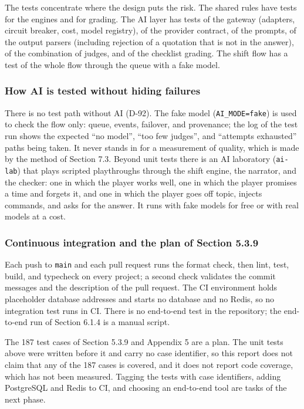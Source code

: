 The tests concentrate where the design puts the risk. The shared rules have tests for the engines and for grading. The AI layer has tests of the gateway (adapters, circuit breaker, cost, model registry), of the provider contract, of the prompts, of the output parsers (including rejection of a quotation that is not in the answer), of the combination of judges, and of the checklist grading. The shift flow has a test of the whole flow through the queue with a fake model.

\subsubsection{How AI is tested without hiding failures}

There is no test path without AI (D-92). The fake model (\texttt{AI\_\allowbreak{}MODE=fake}) is used to check the flow only: queue, events, failover, and provenance; the log of the test run shows the expected ``no model'', ``too few judges'', and ``attempts exhausted'' paths being taken. It never stands in for a measurement of quality, which is made by the method of Section 7.3. Beyond unit tests there is an AI laboratory (\texttt{ai-\allowbreak{}lab}) that plays scripted playthroughs through the shift engine, the narrator, and the checker: one in which the player works well, one in which the player promises a time and forgets it, and one in which the player goes off topic, injects commands, and asks for the answer. It runs with fake models for free or with real models at a cost.

\subsubsection{Continuous integration and the plan of Section 5.3.9}

Each push to \texttt{main} and each pull request runs the format check, then lint, test, build, and typecheck on every project; a second check validates the commit messages and the description of the pull request. The CI environment holds placeholder database addresses and starts no database and no Redis, so no integration test runs in CI. There is no end-to-end test in the repository; the end-to-end run of Section 6.1.4 is a manual script.

The 187 test cases of Section 5.3.9 and Appendix 5 are a plan. The unit tests above were written before it and carry no case identifier, so this report does not claim that any of the 187 cases is covered, and it does not report code coverage, which has not been measured. Tagging the tests with case identifiers, adding PostgreSQL and Redis to CI, and choosing an end-to-end tool are tasks of the next phase.

